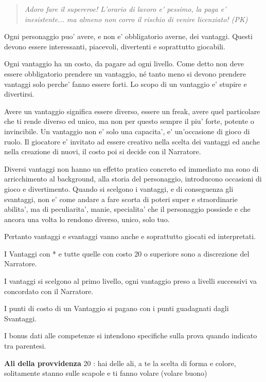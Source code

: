\documentclass[a4paper,11pt,twoside,openany]{book}
\begin{document}
	\label{vantaggi}
	\begin{quote}\textit{
			Adoro fare il supereroe! L'orario di lavoro e' pessimo, la paga e' inesistente... ma almeno non corro il rischio di venire licenziato! (PK)
	}\end{quote}
	
	\bigskip
	
	Ogni personaggio puo' avere, e non e' obbligatorio averne, dei vantaggi. Questi devono essere interessanti, piacevoli, divertenti e soprattutto giocabili.
	
	Ogni vantaggio ha un costo, da pagare ad ogni livello. Come detto non deve essere obbligatorio prendere un vantaggio, né tanto meno si devono prendere vantaggi solo perche' fanno essere forti. Lo scopo di un vantaggio e' stupire e divertirsi. 
	
	Avere un vantaggio significa essere diverso, essere un freak, avere quel particolare che ti rende diverso ed unico, ma non per questo sempre il piu' forte, potente o invincibile. Un vantaggio non e' solo una capacita', e' un'occasione di gioco di ruolo. Il giocatore e' invitato ad essere creativo nella scelta dei vantaggi ed anche nella creazione di nuovi, il costo poi si decide con il Narratore.
	
	Diversi vantaggi non hanno un effetto pratico concreto ed immediato ma sono di arricchimento al background, alla storia del personaggio, introducono occasioni di gioco e divertimento. Quando si scelgono i vantaggi, e di conseguenza gli svantaggi, non e' come andare a fare scorta di poteri super e straordinarie abilita', ma di peculiarita', manie, specialita' che il personaggio possiede e che ancora una volta lo rendono diverso, unico, solo tuo. 
	
	Pertanto vantaggi e svantaggi vanno anche e soprattutto giocati ed interpretati.
	
	I Vantaggi con {*} e tutte quelle con costo 20 o superiore sono a discrezione del Narratore.
	
	I vantaggi si scelgono al primo livello, ogni vantaggio preso a livelli successivi va concordato con il Narratore.
	
	I punti di costo di un Vantaggio si pagano con i punti guadagnati dagli Svantaggi.
	
	I bonus dati alle competenze si intendono specifiche sulla prova quando indicato tra parentesi.
	
	\bigskip
	
	\textbf{Ali della provvidenza} 20 : hai delle ali, a te la scelta di forma e colore, solitamente stanno sulle scapole e ti fanno volare (volare buono)
	
\end{document}
